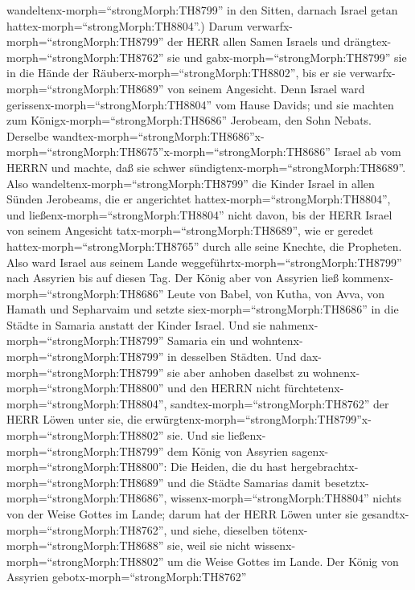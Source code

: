 wandeltenx-morph=``strongMorph:TH8799'' in den Sitten, darnach Israel
getan hattex-morph=``strongMorph:TH8804''.)  Darum
verwarfx-morph=``strongMorph:TH8799'' der HERR allen Samen Israels und
drängtex-morph=``strongMorph:TH8762'' sie und
gabx-morph=``strongMorph:TH8799'' sie in die Hände der
Räuberx-morph=``strongMorph:TH8802'', bis er sie
verwarfx-morph=``strongMorph:TH8689'' von seinem Angesicht.
 Denn Israel ward gerissenx-morph=``strongMorph:TH8804''
vom Hause Davids; und sie machten zum
Königx-morph=``strongMorph:TH8686'' Jerobeam, den Sohn Nebats. Derselbe
wandtex-morph=``strongMorph:TH8686''\textbar x-morph=``strongMorph:TH8675''x-morph=``strongMorph:TH8686''
Israel ab vom HERRN und machte, daß sie schwer
sündigtenx-morph=``strongMorph:TH8689''.  Also
wandeltenx-morph=``strongMorph:TH8799'' die Kinder Israel in allen
Sünden Jerobeams, die er angerichtet
hattex-morph=``strongMorph:TH8804'', und
ließenx-morph=``strongMorph:TH8804'' nicht davon,  bis der
HERR Israel von seinem Angesicht tatx-morph=``strongMorph:TH8689'', wie
er geredet hattex-morph=``strongMorph:TH8765'' durch alle seine Knechte,
die Propheten. Also ward Israel aus seinem Lande
weggeführtx-morph=``strongMorph:TH8799'' nach Assyrien bis auf diesen
Tag.  Der König aber von Assyrien ließ
kommenx-morph=``strongMorph:TH8686'' Leute von Babel, von Kutha, von
Avva, von Hamath und Sepharvaim und setzte
siex-morph=``strongMorph:TH8686'' in die Städte in Samaria anstatt der
Kinder Israel. Und sie nahmenx-morph=``strongMorph:TH8799'' Samaria ein
und wohntenx-morph=``strongMorph:TH8799'' in desselben Städten.
 Und dax-morph=``strongMorph:TH8799'' sie aber anhoben
daselbst zu wohnenx-morph=``strongMorph:TH8800'' und den HERRN nicht
fürchtetenx-morph=``strongMorph:TH8804'',
sandtex-morph=``strongMorph:TH8762'' der HERR Löwen unter sie, die
erwürgtenx-morph=``strongMorph:TH8799''x-morph=``strongMorph:TH8802''
sie.  Und sie ließenx-morph=``strongMorph:TH8799'' dem
König von Assyrien sagenx-morph=``strongMorph:TH8800'': Die Heiden, die
du hast hergebrachtx-morph=``strongMorph:TH8689'' und die Städte
Samarias damit besetztx-morph=``strongMorph:TH8686'',
wissenx-morph=``strongMorph:TH8804'' nichts von der Weise Gottes im
Lande; darum hat der HERR Löwen unter sie
gesandtx-morph=``strongMorph:TH8762'', und siehe, dieselben
tötenx-morph=``strongMorph:TH8688'' sie, weil sie nicht
wissenx-morph=``strongMorph:TH8802'' um die Weise Gottes im Lande.
 Der König von Assyrien gebotx-morph=``strongMorph:TH8762''

